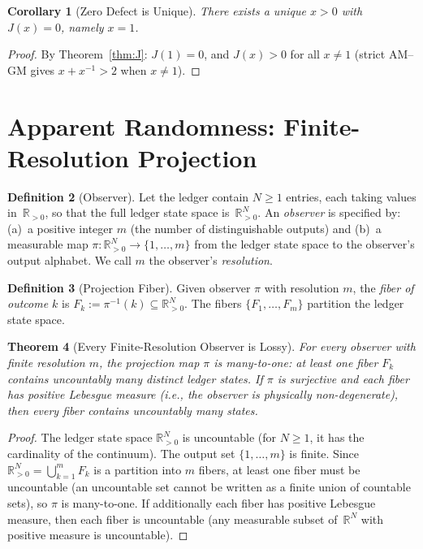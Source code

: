 \documentclass[12pt,a4paper]{article}
\newtheorem{theorem}{Theorem}[section]
\newtheorem{corollary}[theorem]{Corollary}
\theoremstyle{definition}
\newtheorem{definition}[theorem]{Definition}
\theoremstyle{remark}
\begin{document}
\begin{corollary}[Zero Defect is Unique]
\label{cor:det-resolution}
There exists a unique $x > 0$ with $J(x) = 0$, namely $x = 1$.
\end{corollary}

\begin{proof}
By Theorem~\ref{thm:J}: $J(1) = 0$, and $J(x) > 0$ for all $x \neq 1$
(strict AM--GM gives $x + x^{-1} > 2$ when $x \neq 1$).
\end{proof}

\section{Apparent Randomness: Finite-Resolution Projection}
\label{sec:randomness}

\begin{definition}[Observer]
\label{def:observer}
Let the ledger contain $N \geq 1$ entries, each taking values
in~$\mathbb{R}_{>0}$, so that the full ledger state space
is~$\mathbb{R}_{>0}^N$.  An \emph{observer} is specified by:
(a)~a positive integer $m$ (the number of distinguishable outputs)
and (b)~a measurable map
$\pi : \mathbb{R}_{>0}^N \to \{1, \ldots, m\}$ from the ledger state
space to the observer's output alphabet.  We call $m$ the observer's
\emph{resolution}.
\end{definition}

\begin{definition}[Projection Fiber]
\label{def:fiber}
Given observer $\pi$ with resolution $m$, the \emph{fiber of outcome $k$}
is $F_k := \pi^{-1}(k) \subseteq \mathbb{R}_{>0}^N$.  The fibers
$\{F_1, \ldots, F_m\}$ partition the ledger state space.
\end{definition}

\begin{theorem}[Every Finite-Resolution Observer is Lossy]
\label{thm:lossy}
For every observer with finite resolution $m$, the projection map $\pi$
is many-to-one: at least one fiber $F_k$ contains uncountably many
distinct ledger states.  If $\pi$ is surjective and each fiber has
positive Lebesgue measure (i.e., the observer is physically non-degenerate),
then \emph{every} fiber contains uncountably many states.
\end{theorem}

\begin{proof}
The ledger state space $\mathbb{R}_{>0}^N$ is uncountable (for $N \geq 1$,
it has the cardinality of the continuum).  The output set $\{1, \ldots, m\}$
is finite.  Since $\mathbb{R}_{>0}^N = \bigcup_{k=1}^m F_k$ is a
partition into $m$ fibers, at least one fiber must be uncountable (an
uncountable set cannot be written as a finite union of countable sets),
so $\pi$ is many-to-one.  If additionally each fiber has positive
Lebesgue measure, then each fiber is uncountable (any measurable subset
of~$\mathbb{R}^N$ with positive measure is uncountable).
\end{proof}
\end{document}
